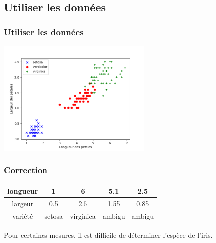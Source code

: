 \documentclass[svgnames,11pt]{beamer}
\begin{document}
\subsection{Utiliser les données}
\begin{frame}
    \frametitle{Utiliser les données}

    \begin{activite}
        \begin{center}
            \centering
            \includegraphics[width=7.5cm]{ressources/iris-graphe.png}
            \label{IMG}
        \end{center}
    \end{activite}

\end{frame}
\begin{frame}
    \frametitle{Correction}
    \begin{center}
        \begin{tabular}{|*{5}{c|}}
            \hline
            longueur & 1      & 6         & 5.1    & 2.5    \\
            \hline
            largeur  & 0.5    & 2.5       & 1.55   & 0.85   \\
            \hline
            variété  & setosa & virginica & ambigu & ambigu \\
            \hline
        \end{tabular}
    \end{center}
    \begin{aretenir}[Observation]
        Pour certaines mesures, il est difficile de déterminer l'espèce de l'iris.
    \end{aretenir}

\end{frame}
\end{document}
